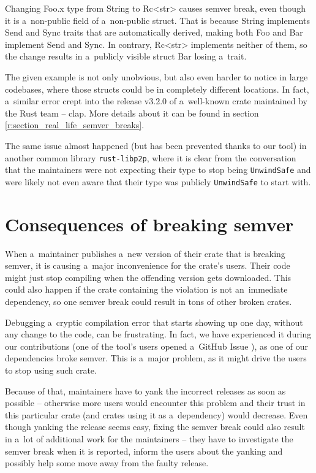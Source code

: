 \documentclass[licencjacka,en]{pracamgr}
\begin{document}
Changing {\ttfamily Foo.x} type from {\ttfamily String} to {\ttfamily Rc<str>}
causes semver break, even though it is a~non-public field of a~non-public struct.
That is because {\ttfamily String} implements {\ttfamily Send} and {\ttfamily Sync} traits
that are automatically derived, making both {\ttfamily Foo} and {\ttfamily Bar}
implement {\ttfamily Send} and {\ttfamily Sync}.
In contrary, {\ttfamily Rc<str>} implements neither of them,
so the change results in a~publicly visible struct {\ttfamily Bar} losing a~trait.

The given example is not only unobvious, but also even harder to notice in large codebases, where
those structs could be in completely different locations. In fact, a~similar error crept into the
release v3.2.0 of a~well-known crate maintained by the Rust team -- {\ttfamily clap}. More details
about it can be found in section \ref{r:section_real_life_semver_breaks}.

The same issue almost happened (but has been prevented thanks to our tool) in another common
library \texttt{rust-libp2p}, where it is clear from the conversation \cite{issue-libp2p} that
the maintainers were not expecting their type to stop being \texttt{UnwindSafe} and were likely
not even aware that their type was publicly \texttt{UnwindSafe} to start with.

\section{Consequences of breaking semver}\label{r:section_semver_breaking_consequences}

When a~maintainer publishes a~new version of their crate that is breaking semver,
it is causing a~major inconvenience for the crate's users.
Their code might just stop compiling when the offending version gets downloaded.
This could also happen if the crate containing the violation is not an~immediate dependency,
so one semver break could result in tons of other broken crates.

Debugging a~cryptic compilation error that starts showing up one day,
without any change to the code, can be frustrating. In fact, we have experienced it during our
contributions (one of the tool's users opened a~GitHub Issue \cite{issue-compiling-fails}), as one
of our dependencies broke semver. This is a~major problem, as it might drive the users to stop
using such crate.

Because of that, maintainers have to yank the incorrect releases as soon as possible -- otherwise
more users would encounter this problem and their trust in this particular crate (and crates using
it as a~dependency) would decrease. Even though yanking the release seems easy, fixing the semver
break could also result in a~lot of additional work for the maintainers -- they have to investigate
the semver break when it is reported, inform the users about the yanking and possibly help some
move away from the faulty release.
\end{document}
